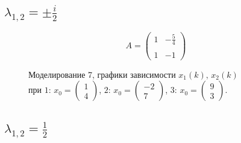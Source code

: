 \documentclass[a5paper, 10pt]{article}
\theoremstyle{definition}
\theoremstyle{plain}
\theoremstyle{remark}
\begin{document}
\subsection{$\lambda_{1, 2} = \pm \frac{i}{2}$}
\begin{equation}
A =
\begin{pmatrix}
1 &  -\frac{5}{4}  \\
\\
1 & -1
\end{pmatrix}
\end{equation}
\begin{figure}[h!]
\caption{Моделирование 7, графики зависимости $x_1 \left( k \right), \, x_2 \left( k \right)$ \\ при  $1: \, x_0 = \begin{pmatrix} 1 \\ 4 \end{pmatrix}$, $2: \, x_0 = \begin{pmatrix} -2 \\ 7 \end{pmatrix}$, $3: \, x_0 = \begin{pmatrix} 9 \\ 3 \end{pmatrix}$.}
\end{figure}


\subsection{$\lambda_{1, 2} = \frac{1}{2}$}
\end{document}
